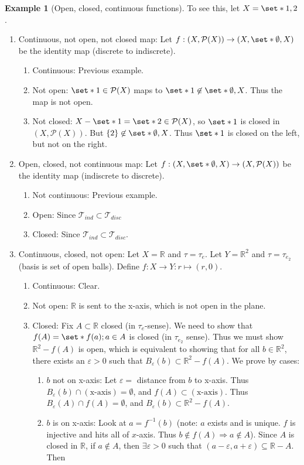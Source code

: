 \documentclass[11pt]{article}
\numberwithin{equation}{section}
\theoremstyle{plain}
\theoremstyle{definition}
\newtheorem{example}{\color{WildStrawberry}Example}[section]
\def\Set{\set*}%
\def\ss{\subset}
\def\sse{\subseteq}
\def\imp{\Rightarrow}
\newcommand{\1}{\mathbbm 1}
\def\t{\tau}
\newcommand{\e}{\varepsilon}
\newcommand{\RR}{\mathbb R}
\newcommand{\pP}{\mathcal P}
\newcommand{\tT}{\mathcal T}
\begin{document}
\begin{example}[Open, closed, continuous functions]
	To see this, let $X = \Set{1,2}$.
	\begin{enumerate}
		\item Continuous, not open, not closed map: Let $f : (X,\pP(X)) \to (X,\Set{\emptyset,X})$ be the identity map (discrete to indiscrete). 
		\begin{enumerate}
			\item Continuous: Previous example.
			\item Not open: $\Set{1} \in \pP(X)$ maps to $\Set{1} \not\in \Set{\emptyset,X}$. Thus the map is not open.
			\item Not closed: $X - \Set{1} = \Set{2} \in \pP(X)$, so $\Set{1}$ is closed in $(X,\pP(X))$. But $\{2\} \not\in \Set{\emptyset,X}$. Thus $\Set{1}$ is closed on the left, but not on the right.
		\end{enumerate} 
		\item Open, closed, not continuous map: Let $f : (X,\Set{\emptyset,X}) \to (X,\pP(X))$ be the identity map (indiscrete to discrete).
		\begin{enumerate}
		 	\item Not continuous: Previous example. 
		 	\item Open: Since $\tT_{ind} \ss \tT_{disc}$ 
		 	\item Closed: Since $\tT_{ind} \ss \tT_{disc}$.
		 \end{enumerate} 
		 \item Continuous, closed, not open: Let $X = \RR$ and $\t = \t_e$. Let $Y = \RR^2$ and $\t = \t_{e_2}$ (basis is set of open balls). Define $f: X\to Y: r \mapsto (r,0)$. 
		 \begin{enumerate}
		 	\item Continuous: Clear. 
		 	\item Not open: $\RR$ is sent to the x-axis, which is not open in the plane. 
		 	\item Closed: Fix $A \ss \RR$ closed (in $\t_e$-sense). We need to show that $f(A) = \Set{f(a); a \in A}$ is closed (in $\t_{e_2}$ sense). Thus we must show $\RR^2 - f(A)$ is open, which is equivalent to showing that for all $b \in \RR^2$, there exists an $\e > 0$ such that $B_\e(b) \ss \RR^2 - f(A)$. We prove by cases:
		 	\begin{enumerate}
		 	 	\item $b$ not on x-axis: Let $\e = $ distance from $b$ to x-axis. Thus $B_\e(b) \cap (\text{x-axis}) = \emptyset$, and $f(A) \ss (\text{x-axis})$. Thus $B_\e(A) \cap f(A) = \emptyset$, and $B_\e(b) \ss \RR^2 - f(A)$. 
		 	 	\item $b$ is on x-axis: Look at $a = f^{-1}(b)$ (note: $a$ exists and is unique. $f$ is injective and  hits all of $x$-axis. Thus $b \not\in f(A) \imp a \not\in A $). Since $A$ is closed in $\RR$, if $a \not\in A$, then $\exists \e > 0$ such that $(a-\e,a+\e) \sse \RR - A$. Then 

\end{enumerate}
\end{enumerate}
\end{enumerate}
\end{example}
\end{document}

